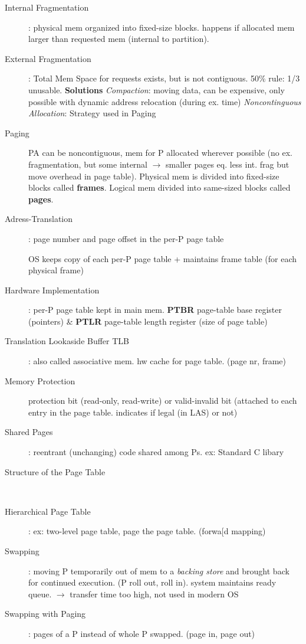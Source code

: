 \begin{description}
    \item[Internal Fragmentation]: physical mem organized into fixed-size blocks. happens if allocated mem larger than requested mem (internal to partition). \\
    \item[External Fragmentation]: Total Mem Space for requests exists, but is not contiguous. 50\% rule: 1/3 unusable. \textbf{Solutions} \textit{Compaction}: moving data, can be expensive, only possible with dynamic address relocation (during ex. time) \textit{Noncontinguous Allocation}: Strategy used in Paging \\
    \item[Paging] PA can be noncontiguous, mem for P allocated wherever possible (no ex. fragmentation, but some internal $\rightarrow$ smaller pages eq. less int. frag but move overhead in page table). Physical mem is divided into fixed-size blocks called \textbf{frames}. Logical mem divided into same-sized blocks called \textbf{pages}.\\
    \item[Adress-Translation]: page number and page offset in the per-P page table
    \item[] OS keeps copy of each per-P page table + maintains frame table (for each physical frame)
    \item[Hardware Implementation]: per-P page table kept in main mem. \textbf{PTBR} page-table base register (pointers) \& \textbf{PTLR} page-table length register (size of page table)
    \item[Translation Lookaside Buffer TLB]: also called associative mem. hw cache for page table. (page nr, frame)
    \item[Memory Protection] protection bit (read-only, read-write) or valid-invalid bit (attached to each entry in the page table. indicates if legal (in LAS) or not)
    \item[Shared Pages]: reentrant (unchanging) code shared among Ps. ex: Standard C libary
    \item[Structure of the Page Table] \\
    \item[Hierarchical Page Table]: ex: two-level page table, page the page table. (forwa[d mapping) \\
    \item[Swapping]: moving P temporarily out of mem to a \textit{backing store} and brought back for continued execution. (P roll out, roll in). system maintains ready queue. $\rightarrow$ transfer time too high, not used in modern OS  \\
    \item[Swapping with Paging]: pages of a P instead of whole P swapped. (page in, page out)
\end{description}
